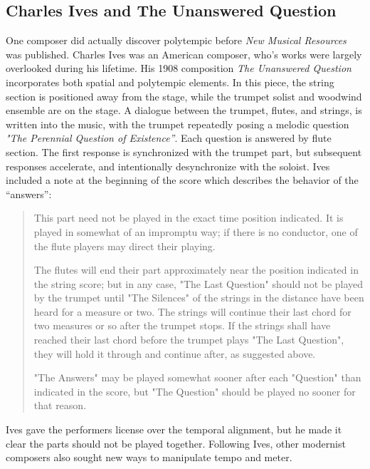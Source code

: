 \subsection{Charles Ives and The Unanswered Question}
\label{sec:charles-ives}
One composer did actually discover polytempic before \textit{New
  Musical Resources} was published. Charles Ives was an American
composer, who's works were largely overlooked during his lifetime. His
1908 composition \textit{The Unanswered Question} incorporates both
spatial and polytempic elements. In this piece, the string section is
positioned away from the stage, while the trumpet solist and woodwind
ensemble are on the stage. A dialogue between the trumpet, flutes, and
strings, is written into the music, with the trumpet repeatedly posing
a melodic question \textit{"The Perennial Question of
  Existence''}. Each question is answered by flute section. The first
response is synchronized with the trumpet part, but subsequent
responses accelerate, and intentionally desynchronize with the
soloist. Ives included a note at the beginning of the score which
describes the behavior of the ``answers'':
\begin{quotation}
This part need not be played in the exact time position indicated. It
is played in somewhat of an impromptu way; if there is no conductor,
one of the flute players may direct their playing.

The flutes will end their part approximately near the position
indicated in the string score; but in any case, "The Last Question"
should not be played by the trumpet until "The Silences" of the
strings in the distance have been heard for a measure or two. The
strings will continue their last chord for two measures or so after
the trumpet stops. If the strings shall have reached their last chord
before the trumpet plays "The Last Question", they will hold it
through and continue after, as suggested above.

"The Answers" may be played somewhat sooner after each "Question" than
indicated in the score, but "The Question" should be played no sooner
for that reason.
\end{quotation}
Ives gave the performers license over the temporal alignment, but he
made it clear the parts should not be played together. Following Ives,
other modernist composers also sought new ways to manipulate tempo and
meter. 

